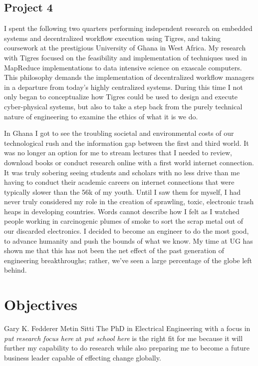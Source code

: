 \documentclass[journal, draftcls]{IEEEtran}
\begin{document}
\subsection{Project 4}
 I spent the following two quarters performing independent research on embedded systems and decentralized workflow execution using Tigres, and taking coursework at the prestigious University of Ghana in West Africa. My research with Tigres  focused on the feasibility and implementation of techniques used in MapReduce implementations to data intensive science on exascale computers. This philosophy demands the implementation of decentralized workflow managers in a departure from today's highly centralized systems. During this time I not only began to conceptualize how Tigres could be used to design and execute cyber-physical systems, but also to take a step back from the purely technical nature of engineering to examine the ethics of what it is we do. 
 
 In Ghana I got to see the troubling societal and environmental costs of our technological rush and the information gap between the first and third world. It was no longer an option for me to stream lectures that I needed to review, download books or conduct research online with a first world internet connection. It was truly sobering seeing students and scholars with no less drive than me having to conduct their academic careers on internet connections that were typically slower than the 56k of my youth. Until I saw them for myself, I had never truly considered my role in the creation of sprawling, toxic, electronic trash heaps in developing countries. Words cannot describe how I felt as I watched people working in carcinogenic plumes of smoke to sort the scrap metal out of our discarded electronics. I decided to become an engineer to do the most good, to advance humanity and push the bounds of what we know. My time at UG has shown me that this has not been the net effect of the past generation of engineering breakthroughs; rather, we've seen a large percentage of the globe left behind. 

\section{Objectives}
Gary K. Fedderer
Metin Sitti
The PhD in Electrical Engineering with a focus in \textit{{put research focus here}} at \textit{{put school here}} is the right fit for me because it will further my capability to do research while also preparing me to become a future business leader capable of effecting change globally. 
\end{document}
